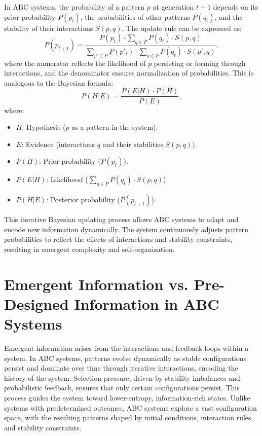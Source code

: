 \documentclass[entropy,article,submit,pdftex,moreauthors]{Definitions/mdpi}
\begin{document}
In ABC systems, the probability of a pattern \( p \) at generation \( t+1 \) depends on its prior probability \( P(p_t) \), the probabilities of other patterns \( P(q_t) \), and the stability of their interactions \( S(p, q) \). The update rule can be expressed as:
\[
P(p_{t+1}) = \frac{P(p_t) \cdot \sum_{q \in P} P(q_t) \cdot S(p, q)}{\sum_{p' \in P} P(p'_t) \cdot \sum_{q \in P} P(q_t) \cdot S(p', q)},
\]
where the numerator reflects the likelihood of \( p \) persisting or forming through interactions, and the denominator ensures normalization of probabilities. This is analogous to the Bayesian formula:
\[
P(H|E) = \frac{P(E|H) \cdot P(H)}{P(E)},
\]
where:
\begin{itemize}
    \item \( H \): Hypothesis (\( p \) as a pattern in the system).
    \item \( E \): Evidence (interactions \( q \) and their stabilities \( S(p, q) \)).
    \item \( P(H) \): Prior probability (\( P(p_t) \)).
    \item \( P(E|H) \): Likelihood (\( \sum_{q \in P} P(q_t) \cdot S(p, q) \)).
    \item \( P(H|E) \): Posterior probability (\( P(p_{t+1}) \)).
\end{itemize}

This iterative Bayesian updating process allows ABC systems to adapt and encode new information dynamically. The system continuously adjusts pattern probabilities to reflect the effects of interactions and stability constraints, resulting in emergent complexity and self-organization.

\section{Emergent Information vs. Pre-Designed Information in ABC Systems}

Emergent information arises from the interactions and feedback loops within a system. In ABC systems, patterns evolve dynamically as stable configurations persist and dominate over time through iterative interactions, encoding the history of the system. Selection pressure, driven by stability imbalances and probabilistic feedback, ensures that only certain configurations persist. This process guides the system toward lower-entropy, information-rich states. Unlike systems with predetermined outcomes, ABC systems explore a vast configuration space, with the resulting patterns shaped by initial conditions, interaction rules, and stability constraints.
\end{document}
